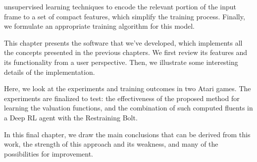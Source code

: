 \begin{description}[style=nextline]
		unsupervised learning techniques to encode the relevant portion of the
		input frame to a set of compact features, which simplify the training
		process. Finally, we formulate an appropriate training algorithm for this
		model.
	\item[\ref{ch:atarieyes}~--~\nameref{ch:atarieyes}]
		This chapter presents the software that we've developed, which implements
		all the concepts presented in the previous chapters. We first review its
		features and its functionality from a user perspective. Then, we
		illustrate some interesting details of the implementation.
	\item[\ref{ch:experiments}~--~\nameref{ch:experiments}]
		Here, we look at the experiments and training outcomes in two Atari
		games. The experiments are finalized to test: the effectiveness of the
		proposed method for learning the valuation functions, and the combination
		of such computed fluents in a Deep RL agent with the Restraining Bolt.
	\item[\ref{ch:conclusions}~--~\nameref{ch:conclusions}]
		In this final chapter, we draw the main conclusions that can be derived
		from this work, the strength of this approach and its weakness, and many
		of the possibilities for improvement.
\end{description}

